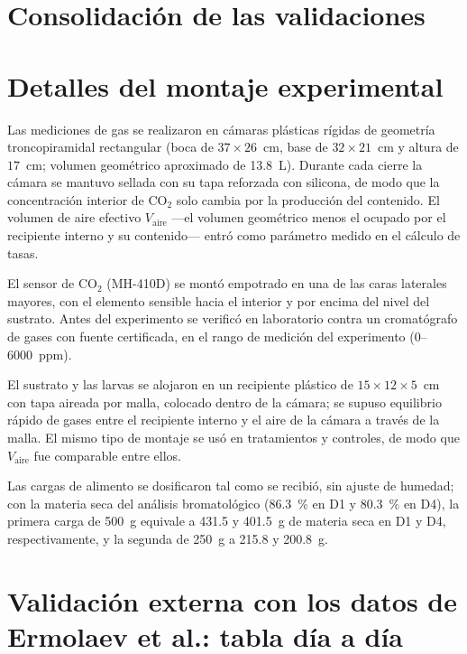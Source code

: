 \documentclass[11pt,a4paper]{article}
\begin{document}
\section{Consolidación de las validaciones}
\label{sec:consol}



\section{Detalles del montaje experimental}
\label{sec:montaje}

Las mediciones de gas se realizaron en cámaras plásticas rígidas de
geometría troncopiramidal rectangular (boca de $37 \times 26$~cm, base de
$32 \times 21$~cm y altura de $17$~cm; volumen geométrico aproximado de
13.8~L). Durante cada cierre la cámara se mantuvo sellada con su tapa
reforzada con silicona, de modo que la concentración interior de CO$_2$ solo
cambia por la producción del contenido. El volumen de aire efectivo
$V_{\mathrm{aire}}$ ---el volumen geométrico menos el ocupado por el
recipiente interno y su contenido--- entró como parámetro medido en el cálculo
de tasas.

El sensor de CO$_2$ (MH-410D) se montó empotrado en una de las caras
laterales mayores, con el elemento sensible hacia el interior y por encima
del nivel del sustrato. Antes del experimento se verificó en laboratorio
contra un cromatógrafo de gases con fuente certificada, en el rango de
medición del experimento (0--6000~ppm).

El sustrato y las larvas se alojaron en un recipiente plástico de
$15 \times 12 \times 5$~cm con tapa aireada por malla, colocado dentro de la
cámara; se supuso equilibrio rápido de gases entre el recipiente interno y el
aire de la cámara a través de la malla. El mismo tipo de montaje se usó en
tratamientos y controles, de modo que $V_{\mathrm{aire}}$ fue comparable
entre ellos.

Las cargas de alimento se dosificaron tal como se recibió, sin ajuste de humedad; con la materia seca del análisis bromatológico (86.3~\% en D1 y 80.3~\% en D4), la primera carga de 500~g equivale a 431.5 y 401.5~g de materia seca en D1 y D4, respectivamente, y la segunda de 250~g a 215.8 y 200.8~g.

\section{Validación externa con los datos de Ermolaev et al.: tabla día a día}
\label{sec:ermoltab}
\end{document}
